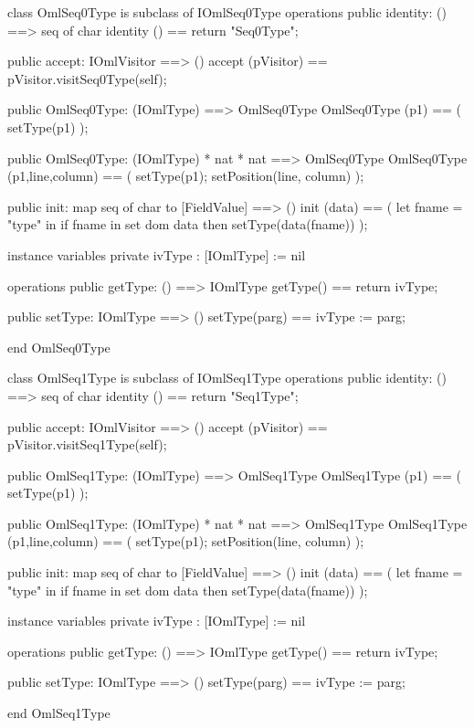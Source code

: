 \begin{vdm_al}
class OmlSeq0Type is subclass of IOmlSeq0Type
operations
  public identity: () ==> seq of char
  identity () == return "Seq0Type";

  public accept: IOmlVisitor ==> ()
  accept (pVisitor) == pVisitor.visitSeq0Type(self);

  public OmlSeq0Type:
    (IOmlType) ==> OmlSeq0Type
  OmlSeq0Type (p1) == 
    ( setType(p1) );

  public OmlSeq0Type:
    (IOmlType) *
    nat *
    nat ==> OmlSeq0Type
  OmlSeq0Type (p1,line,column) == 
    ( setType(p1);
      setPosition(line, column) );

  public init: map seq of char to [FieldValue] ==> ()
  init (data) ==
    ( let fname = "type" in
        if fname in set dom data
        then setType(data(fname)) );

instance variables
  private ivType : [IOmlType] := nil

operations
  public getType: () ==> IOmlType
  getType() == return ivType;

  public setType: IOmlType ==> ()
  setType(parg) == ivType := parg;

end OmlSeq0Type
\end{vdm_al}

\begin{vdm_al}
class OmlSeq1Type is subclass of IOmlSeq1Type
operations
  public identity: () ==> seq of char
  identity () == return "Seq1Type";

  public accept: IOmlVisitor ==> ()
  accept (pVisitor) == pVisitor.visitSeq1Type(self);

  public OmlSeq1Type:
    (IOmlType) ==> OmlSeq1Type
  OmlSeq1Type (p1) == 
    ( setType(p1) );

  public OmlSeq1Type:
    (IOmlType) *
    nat *
    nat ==> OmlSeq1Type
  OmlSeq1Type (p1,line,column) == 
    ( setType(p1);
      setPosition(line, column) );

  public init: map seq of char to [FieldValue] ==> ()
  init (data) ==
    ( let fname = "type" in
        if fname in set dom data
        then setType(data(fname)) );

instance variables
  private ivType : [IOmlType] := nil

operations
  public getType: () ==> IOmlType
  getType() == return ivType;

  public setType: IOmlType ==> ()
  setType(parg) == ivType := parg;

end OmlSeq1Type
\end{vdm_al}

